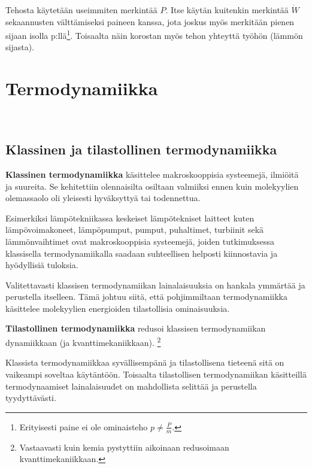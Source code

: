 \documentclass[12pt,a4paper,finnish]{book}
\begin{document}
Tehosta käytetään useimmiten merkintää $P$. Itse käytän kuitenkin merkintää $\dot{W}$ sekaannusten 
välttämiseksi paineen kanssa, jota joskus myös merkitään pienen sijaan isolla p:llä\footnote{
Erityisesti paine ei ole ominaisteho $p \neq \frac{P}{m}$.}. Toisaalta näin 
korostan myös tehon yhteyttä työhön (lämmön sijasta).

\renewcommand{\thepart}{\Roman{part}}
\part{Termodynamiikka} %
\setcounter{chapter}{0}

~\cite{4laws}~\cite{stattherintro}~\cite{thermoeng}~\cite{ltp1}~\cite{fyskem}

\chapter{Klassinen ja tilastollinen termodynamiikka} %

\textbf{Klassinen termodynamiikka} käsittelee makroskooppisia systeemejä, ilmiöitä ja suureita. Se kehitettiin 
olennaisilta osiltaan valmiiksi ennen kuin molekyylien olemassaolo oli yleisesti hyväksyttyä tai todennettua. 

Esimerkiksi lämpötekniikassa keskeiset lämpötekniset laitteet kuten lämpövoimakoneet, 
lämpöpumput, pumput, puhaltimet, turbiinit sekä lämmönvaihtimet ovat makroskooppisia systeemejä, joiden 
tutkimuksessa klassisella termodynamiikalla saadaan suhteellisen helposti kiinnostavia ja hyödyllisiä tuloksia.

Valitettavasti klassisen termodynamiikan lainalaisuuksia on hankala ymmärtää ja perustella itselleen. Tämä johtuu 
siitä, että pohjimmiltaan termodynamiikka käsittelee molekyylien energioiden tilastollisia ominaisuuksia.

\textbf{Tilastollinen termodynamiikka} redusoi klassisen termodynamiikan dynamiikkaan (ja kvanttimekaniikkaan).
\footnote{Vastaavasti kuin kemia pystyttiin aikoinaan redusoimaan kvanttimekaniikkaan.} 

Klassista termodynamiikkaa syvällisempänä ja tilastollisena tieteenä sitä on vaikeampi soveltaa käytäntöön. 
Toisaalta tilastollisen termodynamiikan käsitteillä termodynaamiset lainalaisuudet on mahdollista selittää ja 
perustella tyydyttävästi.
\end{document}
